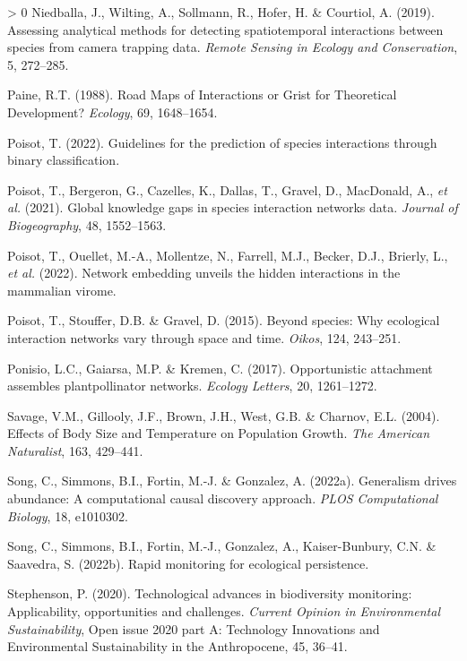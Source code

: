 \documentclass[11pt]{article}
\newlength{\cslhangindent}
\newenvironment{CSLReferences}[3] %
 {%
  \setlength{\parindent}{0pt}
  \ifodd #1 \everypar{\setlength{\hangindent}{\cslhangindent}}\ignorespaces\fi
  \ifnum #2 > 0
  \setlength{\parskip}{#2\baselineskip}
  \fi
 }%
 {}
\begin{document}
\begin{CSLReferences}{1}{0}
\leavevmode\hypertarget{ref-Niedballa2019AssAna}{}%
Niedballa, J., Wilting, A., Sollmann, R., Hofer, H. \& Courtiol, A.
(2019). Assessing analytical methods for detecting spatiotemporal
interactions between species from camera trapping data. \emph{Remote
Sensing in Ecology and Conservation}, 5, 272--285.

\leavevmode\hypertarget{ref-Paine1988RoaMap}{}%
Paine, R.T. (1988). Road Maps of Interactions or Grist for Theoretical
Development? \emph{Ecology}, 69, 1648--1654.

\leavevmode\hypertarget{ref-Poisot2022GuiPre}{}%
Poisot, T. (2022). Guidelines for the prediction of species interactions
through binary classification.

\leavevmode\hypertarget{ref-Poisot2021GloKno}{}%
Poisot, T., Bergeron, G., Cazelles, K., Dallas, T., Gravel, D.,
MacDonald, A., \emph{et al.} (2021). Global knowledge gaps in species
interaction networks data. \emph{Journal of Biogeography}, 48,
1552--1563.

\leavevmode\hypertarget{ref-Poisot2022NetEmb}{}%
Poisot, T., Ouellet, M.-A., Mollentze, N., Farrell, M.J., Becker, D.J.,
Brierly, L., \emph{et al.} (2022). Network embedding unveils the hidden
interactions in the mammalian virome.

\leavevmode\hypertarget{ref-Poisot2015SpeWhy}{}%
Poisot, T., Stouffer, D.B. \& Gravel, D. (2015). Beyond species: Why
ecological interaction networks vary through space and time.
\emph{Oikos}, 124, 243--251.

\leavevmode\hypertarget{ref-Ponisio2017OppAtt}{}%
Ponisio, L.C., Gaiarsa, M.P. \& Kremen, C. (2017). Opportunistic
attachment assembles plantpollinator networks. \emph{Ecology Letters},
20, 1261--1272.

\leavevmode\hypertarget{ref-Savage2004EffBod}{}%
Savage, V.M., Gillooly, J.F., Brown, J.H., West, G.B. \& Charnov, E.L.
(2004). Effects of Body Size and Temperature on Population Growth.
\emph{The American Naturalist}, 163, 429--441.

\leavevmode\hypertarget{ref-Song2022GenDri}{}%
Song, C., Simmons, B.I., Fortin, M.-J. \& Gonzalez, A. (2022a).
Generalism drives abundance: A computational causal discovery approach.
\emph{PLOS Computational Biology}, 18, e1010302.

\leavevmode\hypertarget{ref-Song2022RapMon}{}%
Song, C., Simmons, B.I., Fortin, M.-J., Gonzalez, A., Kaiser-Bunbury,
C.N. \& Saavedra, S. (2022b). Rapid monitoring for ecological
persistence.

\leavevmode\hypertarget{ref-Stephenson2020TecAdv}{}%
Stephenson, P. (2020). Technological advances in biodiversity
monitoring: Applicability, opportunities and challenges. \emph{Current
Opinion in Environmental Sustainability}, Open issue 2020 part A:
Technology Innovations and Environmental Sustainability in the
Anthropocene, 45, 36--41.


\end{CSLReferences}
\end{document}
